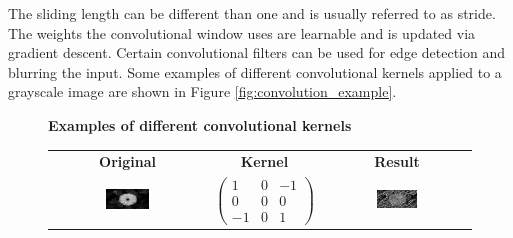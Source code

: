 \begin{description}
        The sliding length can be different than one and is usually referred to
        as stride. The weights the convolutional window uses are learnable and
        is updated via gradient descent. Certain convolutional filters can be
        used for edge detection and blurring the input. Some examples of
        different convolutional kernels applied to a grayscale image are shown
        in Figure \ref{fig:convolution_example}.

        \begin{figure}
            \centering
            \textbf{Examples of different convolutional kernels}\par\medskip
            \begin{tabular}{ccc}
                \textbf{Original} & \textbf{Kernel} & \textbf{Result} \\
                \includegraphics[width=0.3\textwidth]{./pictures/method/original_convolution.png} &
                \begin{minipage}{6cm}
                    \begin{equation*}
                        \begin{pmatrix}
                            1 & 0 & -1 \\
                            0 & 0 & 0  \\
                            -1 & 0 & 1
                        \end{pmatrix}
                    \end{equation*}
                \end{minipage}
                    &
                \includegraphics[width=0.3\textwidth]{./pictures/method/edge_detect_convolution.png} \\


\end{tabular}
\end{figure}
\end{description}
